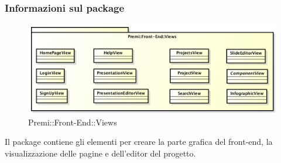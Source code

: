 \subsubsection*{Informazioni sul package}
\begin{figure}[h]
	\centering
	\includegraphics[width=0.9\linewidth]{img/front-end_views}
	\caption[Premi::Front-End::Views]{Premi::Front-End::Views}
\end{figure}
Il package contiene gli elementi per creare la parte grafica del \gls{front-end}, la visualizzazione delle pagine e dell'editor del progetto.


